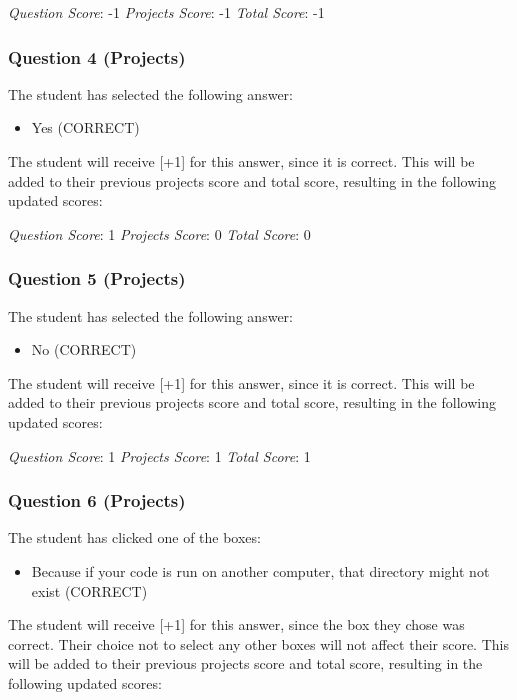 \documentclass[12pt,twoside]{reedthesis}
\providecommand{\tightlist}{%
  \setlength{\itemsep}{0pt}\setlength{\parskip}{0pt}}
\begin{document}
\emph{Question Score}: -1 \emph{Projects Score}: -1 \emph{Total Score}: -1

\hypertarget{question-4-projects-1}{%
\subsubsection{Question 4 (Projects)}\label{question-4-projects-1}}

The student has selected the following answer:
\begin{itemize}
\tightlist
\item
  Yes (CORRECT)
\end{itemize}
The student will receive {[}+1{]} for this answer, since it is correct. This will be added to their previous projects score and total score, resulting in the following updated scores:

\emph{Question Score}: 1 \emph{Projects Score}: 0 \emph{Total Score}: 0

\hypertarget{question-5-projects-1}{%
\subsubsection{Question 5 (Projects)}\label{question-5-projects-1}}

The student has selected the following answer:
\begin{itemize}
\tightlist
\item
  No (CORRECT)
\end{itemize}
The student will receive {[}+1{]} for this answer, since it is correct. This will be added to their previous projects score and total score, resulting in the following updated scores:

\emph{Question Score}: 1 \emph{Projects Score}: 1 \emph{Total Score}: 1

\hypertarget{question-6-projects-1}{%
\subsubsection{Question 6 (Projects)}\label{question-6-projects-1}}

The student has clicked one of the boxes:
\begin{itemize}
\tightlist
\item
  Because if your code is run on another computer, that directory might not exist (CORRECT)
\end{itemize}
The student will receive {[}+1{]} for this answer, since the box they chose was correct. Their choice not to select any other boxes will not affect their score. This will be added to their previous projects score and total score, resulting in the following updated scores:
\end{document}
